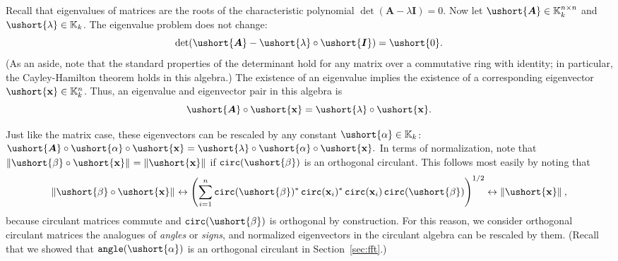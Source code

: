 \documentclass[1p,authoryear,letterpaper]{elsarticle}
\DeclareMathOperator{\tcirc}{\texttt{circ}}
\providecommand{\KK}{\mathbb{K}}
\providecommand{\normof}[2][]{\left\| #2 \right\|_{#1}}\providecommand{\nnormof}[2][]{\| #2 \|_{#1}}\providecommand{\itr}[2]{#1^{(#2)}}
\providecommand{\mat}{\boldsymbol}
\renewcommand{\vec}{\mathbf}
\providecommand{\eye}{\mat{I}}
\providecommand{\mA}{\ensuremath{\mat{A}}}
\providecommand{\vx}{\ensuremath{\vec{x}}}
\renewcommand{\circeq}{\leftrightarrow}
\newcommand{\cel}[1]{\ushort{#1}}
\newcommand{\celm}[1]{\cel{\mat{#1}}}
\newcommand{\celv}[1]{\cel{\vec{#1}}}
\newcommand{\calpha}{\ensuremath{\cel{\alpha}}}
\newcommand{\cbeta}{\ensuremath{\cel{\beta}}}
\newcommand{\clambda}{\ensuremath{\cel{\lambda}}}
\newcommand{\cvx}{\ensuremath{\celv{x}}}
\providecommand{\cmA}{\ensuremath{\celm{A}}}
\providecommand{\cmI}{\ensuremath{\celm{I}}}
\DeclareMathOperator{\tangle}{\texttt{angle}}
\begin{document}
Recall that eigenvalues of matrices are the roots of the
characteristic polynomial $\det(\mA - \lambda \eye) = 0.$
Now let $\cmA \in \KK_k^{n \times n}$
and $\clambda \in \KK_k$.
The eigenvalue problem does not change:
\[ \det(\cmA - \cel{\lambda} \circ \cmI) = \cel{0}. \]
(As an aside, note that the standard properties of the determinant hold for any
matrix over a commutative ring with identity; in particular,
the Cayley-Hamilton theorem holds in this algebra.)
The existence of an eigenvalue implies
the existence of a corresponding eigenvector $\cvx \in \KK_k^{n}$.
Thus, an eigenvalue and eigenvector pair in this algebra is
\[ \cmA \circ \cvx = \clambda \circ \cvx. \]


Just like the matrix case, these eigenvectors can
be rescaled by any constant $\calpha \in \KK_k$:
$ \cmA \circ \calpha \circ \cvx = \clambda \circ \calpha \circ \cvx. $
In terms of normalization, note that
$\normof{\cbeta \circ \cvx} = \normof{\cvx}$
if $\tcirc(\cbeta)$ is an orthogonal circulant.  This follows
most easily by noting that
\[ \normof{\cbeta \circ \cvx} \circeq
   \left( \sum_{i=1}^n \tcirc(\cbeta)^* \tcirc(\vx_i)^* \tcirc(\vx_i) \tcirc(\cbeta) \right)^{1/2}
   \circeq \normof{\cvx}, \]
because circulant matrices commute and $\tcirc(\cbeta)$ is orthogonal by construction.
For this reason, we consider orthogonal circulant matrices the
analogues of \emph{angles} or \emph{signs}, and normalized eigenvectors in the circulant algebra
can be rescaled by them. (Recall that we showed
that $\tangle(\calpha)$ is an orthogonal circulant in
Section~\ref{sec:fft}.)
\end{document}
